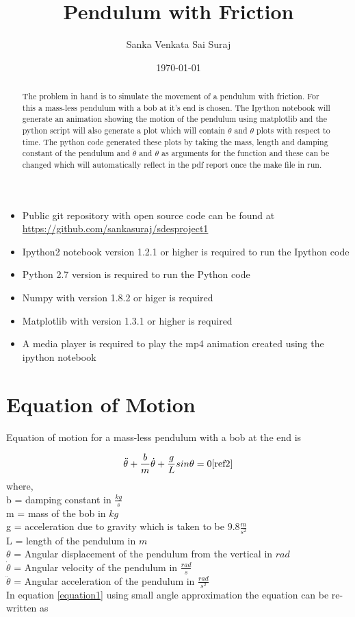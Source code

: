 \documentclass[12pt, a4paper]{report}
\title{Pendulum with Friction}
\author{Sanka Venkata Sai Suraj}
\affil{Rollno: 130010057}
\date{\today}
\begin{document}
\maketitle

\begin{abstract}
The problem in hand is to simulate the movement of a pendulum with friction. For this a mass-less pendulum with a bob at it's end is chosen. The Ipython notebook will generate an animation showing the motion of the pendulum using matplotlib and the python script will also generate a plot which will contain $\dot{\theta}$ and $\theta$ plots with respect to time. The python code generated these plots by taking the mass, length and damping constant of the pendulum and $\dot{\theta}$ and $\theta$ as arguments for the function and these can be changed which will automatically reflect in the pdf report once the make file in run.
\end{abstract}

\begin{itemize}
\item Public git repository with open source code can be found at \url{https://github.com/sankasuraj/sdesproject1}
\item Ipython2 notebook version 1.2.1 or higher is required to run the Ipython code
\item Python 2.7 version is required to run the Python code
\item Numpy with version 1.8.2 or higer is required
\item Matplotlib with version 1.3.1 or higher is required
\item A media player is required to play the mp4 animation created using the ipython notebook \cite{ref1}
\end{itemize}

\section*{Equation of Motion}
Equation of motion for a mass-less pendulum with a bob at the end is 

\begin{equation}
\label{equation1}
\ddot{\theta} + \frac{b}{m}\dot{\theta} + \frac{g}{L}sin\theta = 0 \cite{ref2}
\end{equation}
\noindent
where,\\
b = damping constant in $\frac{kg}{s}$\\
m = mass of the bob in $kg$\\
g = acceleration due to gravity which is taken to be $9.8\frac{m}{s^2}$\\
L = length of the pendulum in $m$\\
$\theta$ = Angular displacement of the pendulum from the vertical in $rad$\\
$\dot{\theta}$ = Angular velocity of the pendulum in $\frac{rad}{s}$\\
$\ddot{\theta}$ = Angular acceleration of the pendulum in $\frac{rad}{s^2}$\\
\noindent
In equation \ref{equation1} using small angle approximation the equation can be re-written as
\end{document}
